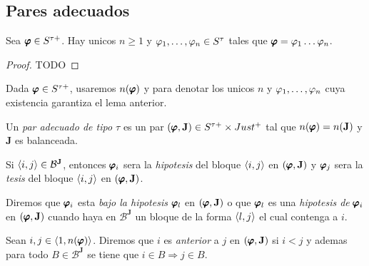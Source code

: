 \subsection{Pares adecuados}
\begin{lemma}
  Sea $\pvarphi\in S^{\tau+}$. Hay unicos $n\geq1$ y $\succession{\varphi}{1}{n}\in S^\tau$ tales que $\pvarphi=\succession[]{\varphi}{1}{n}$.
\end{lemma}
\begin{proof}
  TODO
\end{proof}

\begin{definition}
  Dada $\pvarphi\in S^{\tau+}$, usaremos $n(\pvarphi)$ y  para denotar los unicos 
  $n $ y $\succession{\varphi}{1}{n}$ cuya existencia garantiza el lema anterior.
\end{definition}

\begin{definition}
  Un \emph{par adecuado de tipo $\tau$} es un par $\padec\in S^{\tau+}\times Just^+$ tal que $n(\pvarphi)=n(\mathbf{J})$ y $\mathbf{J}$ es balanceada.

  Si $\bloq{i}{j} \in \mathcal{B}^\mathbf{J}$, entonces $\pvarphi_i$ sera la \emph{hipotesis} del bloque $\bloq{i}{j}$ en $\padec$ y 
  $\pvarphi_j$ sera la \emph{tesis} del bloque $\bloq{i}{j}$ en $\padec$.

  Diremos que $\pvarphi_i$ esta \emph{bajo la hipotesis} $\pvarphi_l$ en $\padec$ o que $\pvarphi_l$ es una 
  \emph{hipotesis de } $\pvarphi_i$ en $\padec$ cuando haya en $\mathcal{B}^\mathbf{J}$ un bloque de la forma $\bloq{l}{j}$ el cual 
  contenga a $i$.
  
  Sean $i,j\in\bloq{1}{n(\pvarphi)}$. Diremos que $i$ es \emph{anterior} a $j$ en $\padec$ si $i < j$ y ademas para todo $B \in \mathcal{B}^\mathbf{J}$ se tiene 
  que $i\in B \Rightarrow j\in B$.
\end{definition}

